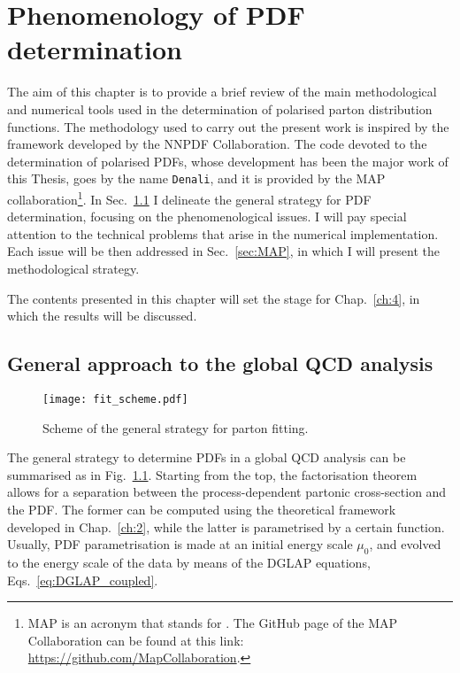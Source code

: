 \chapter{Phenomenology of PDF determination}
\label{ch:3}

The aim of this chapter is to provide a brief review of the main methodological and numerical tools used in the determination of polarised parton distribution functions. The methodology used to carry out the present work is inspired by the framework developed by the NNPDF Collaboration. The code devoted to the determination of polarised PDFs, whose development has been the major work of this Thesis, goes by the name \texttt{Denali}, and it is provided by the MAP collaboration\footnote{\footnotesize MAP is an acronym that stands for . The GitHub page of the MAP Collaboration can be found at this link: \href{https://github.com/MapCollaboration}{https://github.com/MapCollaboration}.}. In Sec.~\ref{sec:gen_fit_str} I delineate the general strategy for PDF determination, focusing on the phenomenological issues. I will pay special attention to the technical problems that arise in the numerical implementation. Each issue will be then addressed in Sec.~\ref{sec:MAP}, in which I will present the methodological strategy.%

The contents presented in this chapter will set the stage for Chap.~\ref{ch:4}, in which the results will be discussed.

\section{General approach to the global QCD analysis}
\label{sec:gen_fit_str}

\begin{figure}[t]
  \centering
  \texttt{[image: fit\_scheme.pdf]} 
  \caption{Scheme of the general strategy for parton fitting.}
  \label{fig:fit_strategy}
\end{figure}

The general strategy to determine PDFs in a global QCD analysis can be summarised as in Fig.~\ref{fig:fit_strategy}. Starting from the top, the factorisation theorem allows for a separation between the process-dependent partonic cross-section and the PDF. The former can be computed using the theoretical framework developed in Chap.~\ref{ch:2}, while the latter is parametrised by a certain function. Usually, PDF parametrisation is made at an initial energy scale $\mu_0$, and evolved to the energy scale of the data by means of the DGLAP equations, Eqs.~\eqref{eq:DGLAP_coupled}.%

